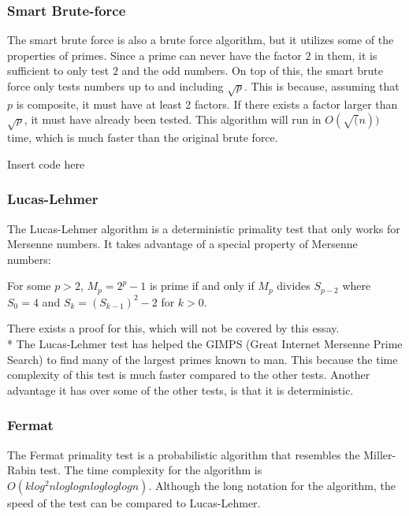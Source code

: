 \documentclass[main.tex]{subfiles}
\begin{document}
\subsubsection{Smart Brute-force}
The smart brute force is also a brute force algorithm, but it utilizes some of
the properties of primes. Since a prime can never have the factor $2$ in them,
it is sufficient to only test $2$ and the odd numbers. On top of this, the smart
brute force only tests numbers up to and including $\sqrt{p}$. This is because,
assuming that $p$ is composite, it must have at least 2 factors. If there exists
a factor larger than $\sqrt{p}$, it must have already been tested. This
algorithm will run in $O(\sqrt(n))$ time, which is much faster than the original
brute force.

\begin{python}
  Insert code here
\end{python}

\subsubsection{Lucas-Lehmer}
The Lucas-Lehmer algorithm is a deterministic primality test that only works for
Mersenne numbers. It takes advantage of a special property of Mersenne numbers:

\begin{mdframed}
  For some $p>2$, $M_p=2^p-1$ is prime if and only if $M_p$ divides $S_{p-2}$
  where $S_0=4$ and $S_k=(S_{k-1})^2-2$ for $k>0$.
\end{mdframed}

There exists a proof for this, which will not be covered by this essay. \newline
\\*
The Lucas-Lehmer test has helped the GIMPS (Great Internet Mersenne Prime
Search) to find many of the largest primes known to man. This because the time
complexity of this test is much faster compared to the other tests. Another
advantage it has over some of the other tests, is that it is deterministic.

\subsubsection{Fermat}
The Fermat primality test \cite{algh:fermat} is a probabilistic algorithm that
resembles the Miller-Rabin test. The time complexity for the algorithm is $O(k
log^{2}n log log n log log log n)$. Although the long notation for the
algorithm, the speed of the test can be compared to Lucas-Lehmer.
\end{document}
